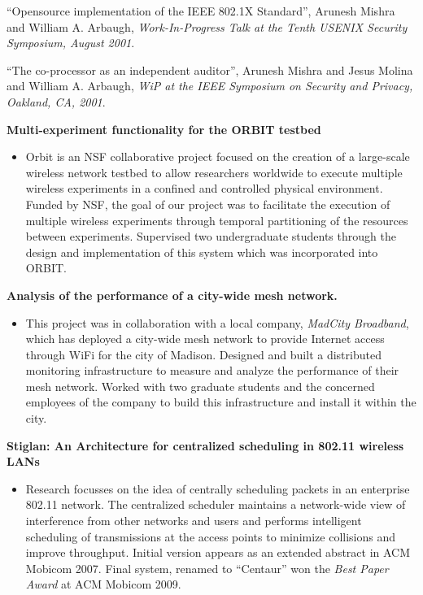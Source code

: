 \begin{resume}
\mybullet ``Opensource implementation of the IEEE 802.1X Standard'', Arunesh Mishra and William A. Arbaugh,
{\em Work-In-Progress Talk at the Tenth USENIX Security Symposium, August 2001}.


\mybullet ``The co-processor as an independent auditor'', Arunesh Mishra and Jesus Molina and William A. Arbaugh,
{\em WiP at the IEEE Symposium on Security and Privacy, Oakland, CA, 2001}.


{\bf Multi-experiment functionality for the ORBIT testbed}
    \begin{itemize}
	\item [] Orbit is an NSF collaborative project focused on the creation of a large-scale wireless network testbed
to allow researchers worldwide to execute  multiple wireless experiments in a
confined and controlled  physical environment.  Funded by NSF, the goal of our
project was to facilitate the execution of multiple wireless experiments
through temporal partitioning of the resources between experiments. Supervised two
undergraduate students through the design and implementation of this system
which was incorporated into ORBIT.
    \end{itemize}
\vspace{-0.2cm}
{\bf Analysis of the performance of a city-wide mesh network. }
    \begin{itemize}
	\item [] This project was in collaboration with a local company, {\it MadCity
 Broadband}, which has deployed a city-wide mesh network to provide Internet access through WiFi
for the city of Madison. Designed and built a distributed monitoring
infrastructure to measure and analyze the performance of their mesh network.
Worked with two graduate students and the concerned employees of the company to
build this infrastructure and install it within the city.
    \end{itemize}
\vspace{-0.2cm}

{\bf Stiglan: An Architecture for centralized scheduling in 802.11 wireless LANs}
    \begin{itemize}
	\item [] Research focusses on the idea of centrally scheduling packets
	in an enterprise 802.11 network. The centralized scheduler maintains a
	network-wide view of interference from other networks and users and
	performs intelligent scheduling of transmissions at the access points
	to minimize collisions and improve throughput. Initial version appears
	as an extended abstract in ACM Mobicom 2007. Final system, renamed to
	``Centaur'' won the {\em Best Paper Award} at ACM Mobicom 2009.
    \end{itemize}
\vspace{-0.2cm}


\end{resume}

